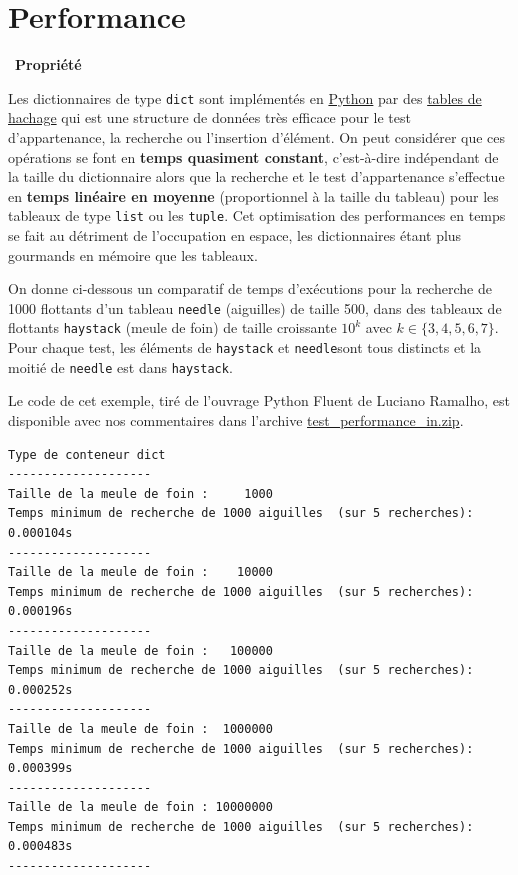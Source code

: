 \documentclass[
  11pt,
]{article}
\newcommand{\passthrough}[1]{#1}
\newcounter{prop}
\newenvironment{propriete}[1]
{\par \medskip   \addtocounter{prop}{1} \noindent  
\begin{bclogo}[arrondi =0.1,  ombre = true, barre=none, logo=\bcbook, marge=4]{~\textbf{Propriété} \textbf{\theprop} {\itshape #1} }   \par}
{
\end{bclogo}
 \par \bigskip }
\begin{document}
\hypertarget{performance}{%
\section{Performance}\label{performance}}

\begin{propriete}{}

Les dictionnaires de type \passthrough{\lstinline!dict!} sont
implémentés en
\href{https://docs.python.org/3/tutorial/datastructures.html}{Python}
par des \href{https://fr.wikipedia.org/wiki/Table_de_hachage}{tables de
hachage} qui est une structure de données très efficace pour le test
d'appartenance, la recherche ou l'insertion d'élément. On peut
considérer que ces opérations se font en \textbf{temps quasiment
constant}, c'est-à-dire indépendant de la taille du dictionnaire alors
que la recherche et le test d'appartenance s'effectue en \textbf{temps
linéaire en moyenne} (proportionnel à la taille du tableau) pour les
tableaux de type \passthrough{\lstinline!list!} ou les
\passthrough{\lstinline!tuple!}. Cet optimisation des performances en
temps se fait au détriment de l'occupation en espace, les dictionnaires
étant plus gourmands en mémoire que les tableaux.

On donne ci-dessous un comparatif de temps d'exécutions pour la
recherche de 1000 flottants d'un tableau
\passthrough{\lstinline!needle!} (aiguilles) de taille 500, dans des
tableaux de flottants \passthrough{\lstinline!haystack!} (meule de foin)
de taille croissante \(10^{k}\) avec \(k \in \{3,4,5,6,7\}\). Pour
chaque test, les éléments de \passthrough{\lstinline!haystack!} et
\passthrough{\lstinline!needle!}sont tous distincts et la moitié de
\passthrough{\lstinline!needle!} est dans
\passthrough{\lstinline!haystack!}.

Le code de cet exemple, tiré de l'ouvrage Python Fluent de Luciano
Ramalho, est disponible avec nos commentaires dans l'archive
\href{https://gitlab.com/frederic-junier/nsi/-/blob/master/TypesConstruits/Dictionnaires/Cours/ressources/test_performance_in.zip}{test\_performance\_in.zip}.

\begin{lstlisting}
Type de conteneur dict
--------------------
Taille de la meule de foin :     1000
Temps minimum de recherche de 1000 aiguilles  (sur 5 recherches): 0.000104s
--------------------
Taille de la meule de foin :    10000
Temps minimum de recherche de 1000 aiguilles  (sur 5 recherches): 0.000196s
--------------------
Taille de la meule de foin :   100000
Temps minimum de recherche de 1000 aiguilles  (sur 5 recherches): 0.000252s
--------------------
Taille de la meule de foin :  1000000
Temps minimum de recherche de 1000 aiguilles  (sur 5 recherches): 0.000399s
--------------------
Taille de la meule de foin : 10000000
Temps minimum de recherche de 1000 aiguilles  (sur 5 recherches): 0.000483s
--------------------


\end{lstlisting}
\end{propriete}
\end{document}
